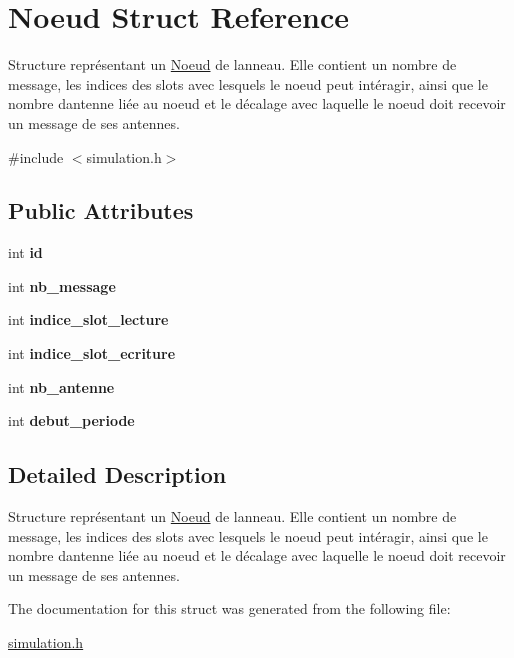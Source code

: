 \hypertarget{structNoeud}{}\section{Noeud Struct Reference}
\label{structNoeud}


Structure représentant un \hyperlink{structNoeud}{Noeud} de l\textquotesingle{}anneau. Elle contient un nombre de message, les indices des slots avec lesquels le noeud peut intéragir, ainsi que le nombre d\textquotesingle{}antenne liée au noeud et le décalage avec laquelle le noeud doit recevoir un message de ses antennes.  




{\ttfamily \#include $<$simulation.\+h$>$}

\subsection*{Public Attributes}
\begin{DoxyCompactItemize}
\item 
int {\bfseries id}\hypertarget{structNoeud_a1b6888482323cacd7d9c88b8a5f5349b}{}\label{structNoeud_a1b6888482323cacd7d9c88b8a5f5349b}

\item 
int {\bfseries nb\+\_\+message}\hypertarget{structNoeud_ada9d4501e40dc1a02b3e670f5571c3fe}{}\label{structNoeud_ada9d4501e40dc1a02b3e670f5571c3fe}

\item 
int {\bfseries indice\+\_\+slot\+\_\+lecture}\hypertarget{structNoeud_a961557c38f6d7dda340bd2d578e24d39}{}\label{structNoeud_a961557c38f6d7dda340bd2d578e24d39}

\item 
int {\bfseries indice\+\_\+slot\+\_\+ecriture}\hypertarget{structNoeud_a2fe175b494abe79f37450fed36640fd4}{}\label{structNoeud_a2fe175b494abe79f37450fed36640fd4}

\item 
int {\bfseries nb\+\_\+antenne}\hypertarget{structNoeud_ae3757667edf62a525471c323a8c65de7}{}\label{structNoeud_ae3757667edf62a525471c323a8c65de7}

\item 
int {\bfseries debut\+\_\+periode}\hypertarget{structNoeud_a7b5aa69f8e61b674c222fcf6218ce7eb}{}\label{structNoeud_a7b5aa69f8e61b674c222fcf6218ce7eb}

\end{DoxyCompactItemize}


\subsection{Detailed Description}
Structure représentant un \hyperlink{structNoeud}{Noeud} de l\textquotesingle{}anneau. Elle contient un nombre de message, les indices des slots avec lesquels le noeud peut intéragir, ainsi que le nombre d\textquotesingle{}antenne liée au noeud et le décalage avec laquelle le noeud doit recevoir un message de ses antennes. 

The documentation for this struct was generated from the following file\+:\begin{DoxyCompactItemize}
\item 
\hyperlink{simulation_8h}{simulation.\+h}\end{DoxyCompactItemize}
